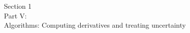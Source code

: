 \documentclass[aspectratio=169,xcolor=dvipsnames,10pt]{beamer}
\begin{document}
\begin{frame}\frametitle{}
\begin{center}\Large
Section 1\\
Part V:\\
Algorithms: Computing derivatives and treating uncertainty
\end{center}
\end{frame}



\end{document}
